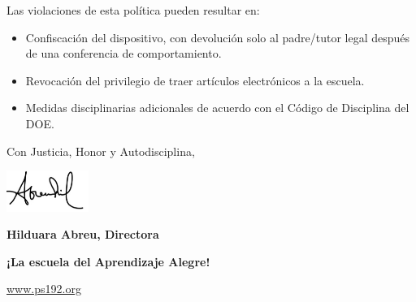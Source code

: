 \documentclass[letterpaper, 12pt]{article}
\begin{document}
Las violaciones de esta política pueden resultar en:
\begin{itemize}
\item Confiscación del dispositivo, con devolución solo al padre/tutor legal después de una conferencia de comportamiento.
\item Revocación del privilegio de traer artículos electrónicos a la escuela.
\item Medidas disciplinarias adicionales de acuerdo con el Código de Disciplina del DOE.
\end{itemize}

Con Justicia, Honor y Autodisciplina,

\includegraphics[width=0.2\textwidth]{hil_signature}

\textbf{Hilduara Abreu, Directora}

\textbf{¡La escuela del Aprendizaje Alegre!}

\href{https://www.ps192.org}{www.ps192.org}
\end{document}
